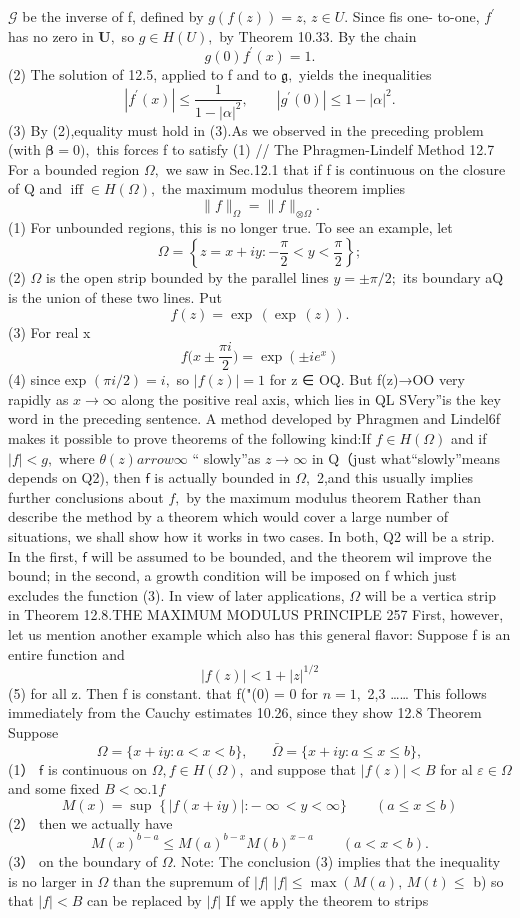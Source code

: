 $\scriptstyle{\mathcal{G}}$ be the inverse of f, defined by $g(f(z))=z,\,z\in U.$ Since fis one- to-one, $f^{\prime}$ has no zero in ${\boldsymbol{U}},$ so $g\in H(U),$ by Theorem 10.33. By the chain $$ g(0)f^{\prime}(x)=1. $$ (2) The solution of 12.5, applied to f and to ${\mathfrak{g}},$ yields the inequalities $$ |f^{\prime}(x)|\leq{\frac{1}{1-|\alpha|^{2}}},\qquad|g^{\prime}(0)|\leq1-|\alpha|^{2}. $$ (3) By (2),equality must hold in (3).As we observed in the preceding problem (with ${\boldsymbol{\beta}}=0),$ this forces f to satisfy (1) // The Phragmen-Lindelf Method 12.7 For a bounded region $\Omega,$ we saw in Sec.12.1 that if f is continuous on the closure of Q and $\operatorname{iff}\in H(\Omega),$ the maximum modulus theorem implies $$ \|f\|_{\Omega}=\|f\|_{\otimes\Omega}. $$ (1) For unbounded regions, this is no longer true. To see an example, let $$ \Omega=\left\{z=x+i y\colon-{\frac{\pi}{2}}<y<{\frac{\pi}{2}}\right\}; $$ (2) $\Omega$ is the open strip bounded by the parallel lines $y=\pm\pi/2;$ its boundary aQ is the union of these two lines. Put $$ f(z)=\exp\,(\exp\,(z)). $$ (3) For real x $$ f{\biggl(}x\pm{\frac{\pi i}{2}}{\biggr)}=\exp\left(\pm i e^{x}\right) $$ (4) since exp $(\pi i/2)=i,$ so $|f(z)|=1$ for z ∈ OQ. But f(z)→OO very rapidly as $x\to\infty$ along the positive real axis, which lies in QL SVery”is the key word in the preceding sentence. A method developed by Phragmen and Lindel6f makes it possible to prove theorems of the following kind:If $f\in H(\Omega)$ and if $|f|<g,$ where $\theta(z) arrow\infty$ “ slowly”as $z\to\infty$ in Q（just what“slowly”means depends on Q2), then $\boldsymbol{\mathsf{f}}$ is actually bounded in $\Omega,$ 2,and this usually implies further conclusions about $f,$ by the maximum modulus theorem Rather than describe the method by a theorem which would cover a large number of situations, we shall show how it works in two cases. In both, Q2 will be a strip. In the first, $\boldsymbol{\mathsf{f}}$ will be assumed to be bounded, and the theorem wil improve the bound; in the second, a growth condition will be imposed on f which just excludes the function (3). In view of later applications, $\Omega$ will be a vertica strip in Theorem 12.8.THE MAXIMUM MODULUS PRINCIPLE 257 First, however, let us mention another example which also has this general flavor: Suppose f is an entire function and $$ |f(z)|<1+|z|^{1/2} $$ (5) for all z. Then f is constant. that f("(0) = 0 for $n=1,$ 2,3 …… This follows immediately from the Cauchy estimates 10.26, since they show 12.8 Theorem Suppose $$ \Omega=\{x+i y\colon a<x<b\},\,\,\,\,\,\,\,\,\,\,\bar{\Omega}=\{x+i y\colon a\leq x\leq b\}, $$ (1） $\boldsymbol{\mathsf{f}}$ is continuous on $\Omega,f\in H(\Omega),$ and suppose that $|f(z)|<B$ for al $\varepsilon\in\Omega$ and some fixed $B<\infty.1f$ $$ M(x)=\operatorname*{sup}\;\{\,|f(x+i y)|:-\;\infty\,<y<\infty\}\qquad(a\leq x\leq b) $$ (2） then we actually have $$ M(x)^{b-a}\leq M(a)^{b-x}M(b)^{x-a}\qquad(a<x<b). $$ (3） on the boundary of $\Omega.$ Note: The conclusion (3) implies that the inequality is no larger in $\Omega$ than the supremum of $|f|$ $|f|\leq\operatorname*{max}\left(M(a),\,M(t)\right.\leq$ b) so that $|f|<B$ can be replaced by $|f|$ If we apply the theorem to strips 